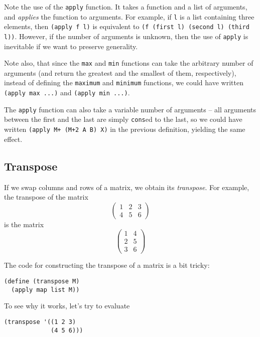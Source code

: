 Note the use of the \texttt{apply} function. It takes
a function and a list of arguments, and \textit{applies}
the function to arguments. For example, if \texttt{l}
is a list containing three elements, then
\texttt{(apply f l)} is equivalent to
\texttt{(f (first l) (second l) (third l))}. However,
if the number of arguments is unknown, then the use
of \texttt{apply} is inevitable if we want to preserve
generality.

Note also, that since the \texttt{max} and \texttt{min}
functions can take the arbitrary number of arguments
(and return the greatest and the smallest of them,
respectively), instead of defining the \texttt{maximum}
and \texttt{minimum} functions, we could have written
\texttt{(apply max ...)} and \texttt{(apply min ...)}.

The \texttt{apply} function can also take a variable
number of arguments -- all arguments between the first
and the last are simply \texttt{cons}ed to the last,
so we could have written \texttt{(apply M+ (M+2 A B) X)}
in the previous definition, yielding the same effect.

\subsection{Transpose}
If we swap columns and rows of a matrix, we obtain
its \textit{transpose}. For example, the transpose
of the matrix
\begin{equation*}
  \begin{pmatrix}
    1 & 2 & 3 \\
    4 & 5 & 6 
  \end{pmatrix}
\end{equation*}
is the matrix
\begin{equation*}
  \begin{pmatrix}
    1 & 4 \\
    2 & 5 \\
    3 & 6
  \end{pmatrix}
\end{equation*}

The code for constructing the transpose of a matrix is
a bit tricky:

\begin{Verbatim}[samepage=true]
(define (transpose M)
  (apply map list M))
\end{Verbatim}

To see why it works, let's try to evaluate
\begin{Verbatim}[samepage=true]
(transpose '((1 2 3)
             (4 5 6)))
\end{Verbatim}

